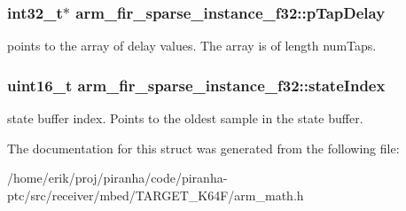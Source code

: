 \subsubsection[{\texorpdfstring{p\+Tap\+Delay}{pTapDelay}}]{\setlength{\rightskip}{0pt plus 5cm}int32\+\_\+t$\ast$ arm\+\_\+fir\+\_\+sparse\+\_\+instance\+\_\+f32\+::p\+Tap\+Delay}\hypertarget{structarm__fir__sparse__instance__f32_aaa54ae67e5d10c6dd0d697945c638d31}{}\label{structarm__fir__sparse__instance__f32_aaa54ae67e5d10c6dd0d697945c638d31}
points to the array of delay values. The array is of length num\+Taps. 
\subsubsection[{\texorpdfstring{state\+Index}{stateIndex}}]{\setlength{\rightskip}{0pt plus 5cm}uint16\+\_\+t arm\+\_\+fir\+\_\+sparse\+\_\+instance\+\_\+f32\+::state\+Index}\hypertarget{structarm__fir__sparse__instance__f32_a57585aeca9dc8686e08df2865375a86d}{}\label{structarm__fir__sparse__instance__f32_a57585aeca9dc8686e08df2865375a86d}
state buffer index. Points to the oldest sample in the state buffer. 

The documentation for this struct was generated from the following file\+:\begin{DoxyCompactItemize}
\item 
/home/erik/proj/piranha/code/piranha-\/ptc/src/receiver/mbed/\+T\+A\+R\+G\+E\+T\+\_\+\+K64\+F/arm\+\_\+math.\+h\end{DoxyCompactItemize}
